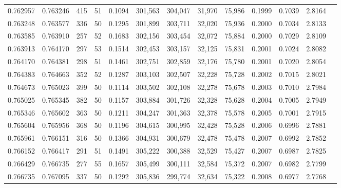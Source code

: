 \begin{tabular}{rrrrrrrrrrrrr}
0.762957 & 0.763246 &   415 &  51 &                                     0.1094 & 301,563 & 304,047 &  31,970 &  75,986 & 0.1999 & 0.7039 & 2.8164 \\
0.763248 & 0.763577 &   336 &  50 &                                     0.1295 & 301,899 & 303,711 &  32,020 &  75,936 & 0.2000 & 0.7034 & 2.8133 \\
0.763585 & 0.763910 &   257 &  52 &                                     0.1683 & 302,156 & 303,454 &  32,072 &  75,884 & 0.2000 & 0.7029 & 2.8109 \\
0.763913 & 0.764170 &   297 &  53 &                                     0.1514 & 302,453 & 303,157 &  32,125 &  75,831 & 0.2001 & 0.7024 & 2.8082 \\
0.764170 & 0.764381 &   298 &  51 &                                     0.1461 & 302,751 & 302,859 &  32,176 &  75,780 & 0.2001 & 0.7020 & 2.8054 \\
0.764383 & 0.764663 &   352 &  52 &                                     0.1287 & 303,103 & 302,507 &  32,228 &  75,728 & 0.2002 & 0.7015 & 2.8021 \\
0.764673 & 0.765023 &   399 &  50 &                                     0.1114 & 303,502 & 302,108 &  32,278 &  75,678 & 0.2003 & 0.7010 & 2.7984 \\
0.765025 & 0.765345 &   382 &  50 &                                     0.1157 & 303,884 & 301,726 &  32,328 &  75,628 & 0.2004 & 0.7005 & 2.7949 \\
0.765346 & 0.765602 &   363 &  50 &                                     0.1211 & 304,247 & 301,363 &  32,378 &  75,578 & 0.2005 & 0.7001 & 2.7915 \\
0.765604 & 0.765956 &   368 &  50 &                                     0.1196 & 304,615 & 300,995 &  32,428 &  75,528 & 0.2006 & 0.6996 & 2.7881 \\
0.765961 & 0.766151 &   316 &  50 &                                     0.1366 & 304,931 & 300,679 &  32,478 &  75,478 & 0.2007 & 0.6992 & 2.7852 \\
0.766152 & 0.766417 &   291 &  51 &                                     0.1491 & 305,222 & 300,388 &  32,529 &  75,427 & 0.2007 & 0.6987 & 2.7825 \\
0.766429 & 0.766735 &   277 &  55 &                                     0.1657 & 305,499 & 300,111 &  32,584 &  75,372 & 0.2007 & 0.6982 & 2.7799 \\
0.766735 & 0.767095 &   337 &  50 &                                     0.1292 & 305,836 & 299,774 &  32,634 &  75,322 & 0.2008 & 0.6977 & 2.7768 \\

\end{tabular}
